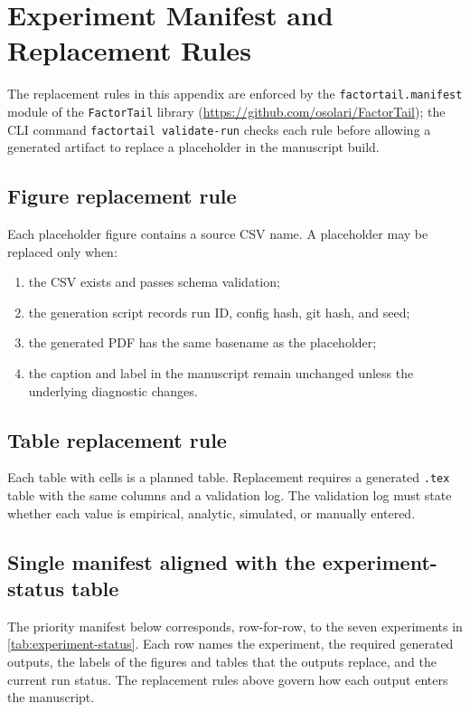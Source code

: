 \section{Experiment Manifest and Replacement Rules}
\label{appx:manifest}

The replacement rules in this appendix are enforced by the
\texttt{factortail.manifest} module of the \texttt{FactorTail} library
(\url{https://github.com/osolari/FactorTail}); the CLI command
\texttt{factortail validate-run} checks each rule before allowing a generated
artifact to replace a placeholder in the manuscript build.

\subsection{Figure replacement rule}

Each placeholder figure contains a source CSV name. A placeholder may be
replaced only when:
\begin{enumerate}
\item the CSV exists and passes schema validation;
\item the generation script records run ID, config hash, git hash, and seed;
\item the generated PDF has the same basename as the placeholder;
\item the caption and label in the manuscript remain unchanged unless the
underlying diagnostic changes.
\end{enumerate}

\subsection{Table replacement rule}

Each table with \xx{} cells is a planned table. Replacement requires a generated
\texttt{.tex} table with the same columns and a validation log. The validation
log must state whether each value is empirical, analytic, simulated, or
manually entered.

\subsection{Single manifest aligned with the experiment-status table}

The priority manifest below corresponds, row-for-row, to the seven experiments
in \cref{tab:experiment-status}. Each row names the experiment, the required
generated outputs, the labels of the figures and tables that the outputs
replace, and the current run status. The replacement rules above govern how
each output enters the manuscript.

